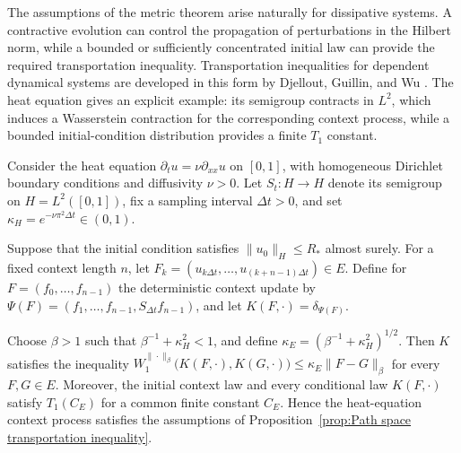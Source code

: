 The assumptions of the metric theorem arise naturally for dissipative systems. A contractive evolution can control the propagation of perturbations in the Hilbert norm, while a bounded or sufficiently concentrated initial law can provide the required transportation inequality. Transportation inequalities for dependent dynamical systems are developed in this form by Djellout, Guillin, and Wu \cite{DjelloutGuillinWu2004}.
The heat equation gives an explicit example: its semigroup contracts in \(L^2\), which induces a Wasserstein contraction for the corresponding context process, while a bounded initial-condition distribution provides a finite \(T_1\) constant.

\begin{example}
\label{ex:Heat equation metric dependence}
Consider the heat equation \(\partial_tu=\nu\partial_{xx}u\) on \([0,1]\), with homogeneous Dirichlet boundary conditions and diffusivity \(\nu>0\). Let \(S_t:H\to H\) denote its semigroup on \(H=L^2([0,1])\), fix a sampling interval \(\Delta t>0\), and set \(\kappa_H=e^{-\nu\pi^2\Delta t}\in(0,1)\).

Suppose that the initial condition satisfies \(\|u_0\|_H\leqslant R_*\) almost surely. For a fixed context length \(n\), let \(F_k=(u_{k\Delta t},\ldots,u_{(k+n-1)\Delta t})\in E\). Define for \(F=(f_0,\ldots,f_{n-1})\) the deterministic context update by \(\Psi(F)=(f_1,\ldots,f_{n-1},S_{\Delta t}f_{n-1})\), and let \(K(F,\cdot)=\delta_{\Psi(F)}\).

Choose \(\beta>1\) such that \(\beta^{-1}+\kappa_H^2<1\), and define \(\kappa_E=(\beta^{-1}+\kappa_H^2)^{1/2}\). Then \(K\) satisfies the inequality
\(
W_1^{\|\cdot\|_\beta}
\bigl(
K(F,\cdot),
K(G,\cdot)
\bigr)
\leqslant
\kappa_E
\|F-G\|_\beta
\)
for every \(F,G\in E\). Moreover, the initial context law and every conditional law \(K(F,\cdot)\) satisfy \(T_1(C_E)\) for a common finite constant \(C_E\). Hence the heat-equation context process satisfies the assumptions of Proposition~\ref{prop:Path space transportation inequality}.
\end{example}

